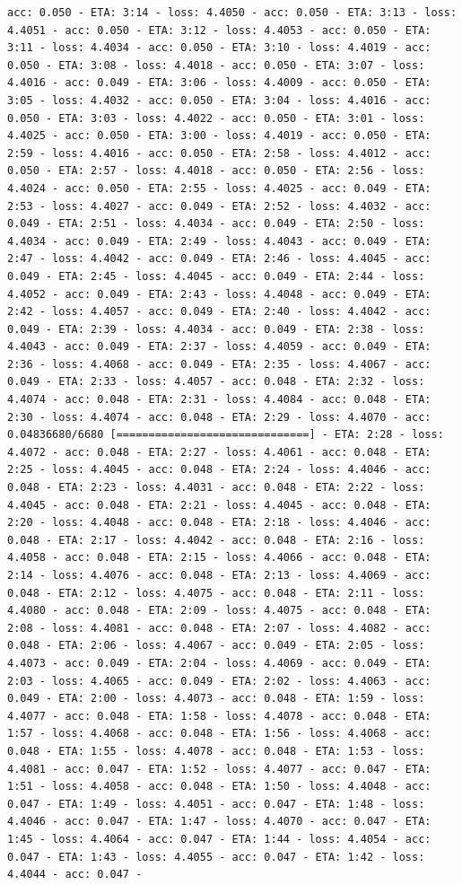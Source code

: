 \documentclass[11pt]{article}
\begin{document}
\begin{Verbatim}[commandchars=\\\{\}]
acc: 0.050 - ETA: 3:14 - loss: 4.4050 - acc: 0.050 - ETA: 3:13 - loss: 4.4051 - acc: 0.050 - ETA: 3:12 - loss: 4.4053 - acc: 0.050 - ETA: 3:11 - loss: 4.4034 - acc: 0.050 - ETA: 3:10 - loss: 4.4019 - acc: 0.050 - ETA: 3:08 - loss: 4.4018 - acc: 0.050 - ETA: 3:07 - loss: 4.4016 - acc: 0.049 - ETA: 3:06 - loss: 4.4009 - acc: 0.050 - ETA: 3:05 - loss: 4.4032 - acc: 0.050 - ETA: 3:04 - loss: 4.4016 - acc: 0.050 - ETA: 3:03 - loss: 4.4022 - acc: 0.050 - ETA: 3:01 - loss: 4.4025 - acc: 0.050 - ETA: 3:00 - loss: 4.4019 - acc: 0.050 - ETA: 2:59 - loss: 4.4016 - acc: 0.050 - ETA: 2:58 - loss: 4.4012 - acc: 0.050 - ETA: 2:57 - loss: 4.4018 - acc: 0.050 - ETA: 2:56 - loss: 4.4024 - acc: 0.050 - ETA: 2:55 - loss: 4.4025 - acc: 0.049 - ETA: 2:53 - loss: 4.4027 - acc: 0.049 - ETA: 2:52 - loss: 4.4032 - acc: 0.049 - ETA: 2:51 - loss: 4.4034 - acc: 0.049 - ETA: 2:50 - loss: 4.4034 - acc: 0.049 - ETA: 2:49 - loss: 4.4043 - acc: 0.049 - ETA: 2:47 - loss: 4.4042 - acc: 0.049 - ETA: 2:46 - loss: 4.4045 - acc: 0.049 - ETA: 2:45 - loss: 4.4045 - acc: 0.049 - ETA: 2:44 - loss: 4.4052 - acc: 0.049 - ETA: 2:43 - loss: 4.4048 - acc: 0.049 - ETA: 2:42 - loss: 4.4057 - acc: 0.049 - ETA: 2:40 - loss: 4.4042 - acc: 0.049 - ETA: 2:39 - loss: 4.4034 - acc: 0.049 - ETA: 2:38 - loss: 4.4043 - acc: 0.049 - ETA: 2:37 - loss: 4.4059 - acc: 0.049 - ETA: 2:36 - loss: 4.4068 - acc: 0.049 - ETA: 2:35 - loss: 4.4067 - acc: 0.049 - ETA: 2:33 - loss: 4.4057 - acc: 0.048 - ETA: 2:32 - loss: 4.4074 - acc: 0.048 - ETA: 2:31 - loss: 4.4084 - acc: 0.048 - ETA: 2:30 - loss: 4.4074 - acc: 0.048 - ETA: 2:29 - loss: 4.4070 - acc: 0.04836680/6680 [==============================] - ETA: 2:28 - loss: 4.4072 - acc: 0.048 - ETA: 2:27 - loss: 4.4061 - acc: 0.048 - ETA: 2:25 - loss: 4.4045 - acc: 0.048 - ETA: 2:24 - loss: 4.4046 - acc: 0.048 - ETA: 2:23 - loss: 4.4031 - acc: 0.048 - ETA: 2:22 - loss: 4.4045 - acc: 0.048 - ETA: 2:21 - loss: 4.4045 - acc: 0.048 - ETA: 2:20 - loss: 4.4048 - acc: 0.048 - ETA: 2:18 - loss: 4.4046 - acc: 0.048 - ETA: 2:17 - loss: 4.4042 - acc: 0.048 - ETA: 2:16 - loss: 4.4058 - acc: 0.048 - ETA: 2:15 - loss: 4.4066 - acc: 0.048 - ETA: 2:14 - loss: 4.4076 - acc: 0.048 - ETA: 2:13 - loss: 4.4069 - acc: 0.048 - ETA: 2:12 - loss: 4.4075 - acc: 0.048 - ETA: 2:11 - loss: 4.4080 - acc: 0.048 - ETA: 2:09 - loss: 4.4075 - acc: 0.048 - ETA: 2:08 - loss: 4.4081 - acc: 0.048 - ETA: 2:07 - loss: 4.4082 - acc: 0.048 - ETA: 2:06 - loss: 4.4067 - acc: 0.049 - ETA: 2:05 - loss: 4.4073 - acc: 0.049 - ETA: 2:04 - loss: 4.4069 - acc: 0.049 - ETA: 2:03 - loss: 4.4065 - acc: 0.049 - ETA: 2:02 - loss: 4.4063 - acc: 0.049 - ETA: 2:00 - loss: 4.4073 - acc: 0.048 - ETA: 1:59 - loss: 4.4077 - acc: 0.048 - ETA: 1:58 - loss: 4.4078 - acc: 0.048 - ETA: 1:57 - loss: 4.4068 - acc: 0.048 - ETA: 1:56 - loss: 4.4068 - acc: 0.048 - ETA: 1:55 - loss: 4.4078 - acc: 0.048 - ETA: 1:53 - loss: 4.4081 - acc: 0.047 - ETA: 1:52 - loss: 4.4077 - acc: 0.047 - ETA: 1:51 - loss: 4.4058 - acc: 0.048 - ETA: 1:50 - loss: 4.4048 - acc: 0.047 - ETA: 1:49 - loss: 4.4051 - acc: 0.047 - ETA: 1:48 - loss: 4.4046 - acc: 0.047 - ETA: 1:47 - loss: 4.4070 - acc: 0.047 - ETA: 1:45 - loss: 4.4064 - acc: 0.047 - ETA: 1:44 - loss: 4.4054 - acc: 0.047 - ETA: 1:43 - loss: 4.4055 - acc: 0.047 - ETA: 1:42 - loss: 4.4044 - acc: 0.047 - 
\end{Verbatim}
\end{document}
